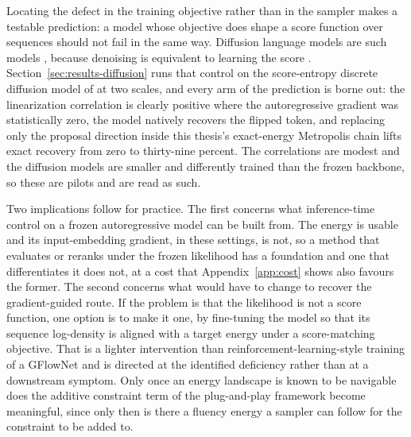 Locating the defect in the training objective rather than in the sampler makes a testable prediction: a model whose objective does shape a score function over sequences should not fail in the same way. Diffusion language models are such models \citep{li2022diffusion, lou2024discrete}, because denoising is equivalent to learning the score \citep{vincent2011connection, song2019generative, ho2020denoising}. Section~\ref{sec:results-diffusion} runs that control on the score-entropy discrete diffusion model of \citet{lou2024discrete} at two scales, and every arm of the prediction is borne out: the linearization correlation is clearly positive where the autoregressive gradient was statistically zero, the model natively recovers the flipped token, and replacing only the proposal direction inside this thesis's exact-energy Metropolis chain lifts exact recovery from zero to thirty-nine percent. The correlations are modest and the diffusion models are smaller and differently trained than the frozen backbone, so these are pilots and are read as such.

Two implications follow for practice. The first concerns what inference-time control on a frozen autoregressive model can be built from. The energy is usable and its input-embedding gradient, in these settings, is not, so a method that evaluates or reranks under the frozen likelihood has a foundation and one that differentiates it does not, at a cost that Appendix~\ref{app:cost} shows also favours the former. The second concerns what would have to change to recover the gradient-guided route. If the problem is that the likelihood is not a score function, one option is to make it one, by fine-tuning the model so that its sequence log-density is aligned with a target energy under a score-matching objective. That is a lighter intervention than reinforcement-learning-style training of a GFlowNet and is directed at the identified deficiency rather than at a downstream symptom. Only once an energy landscape is known to be navigable does the additive constraint term of the plug-and-play framework become meaningful, since only then is there a fluency energy a sampler can follow for the constraint to be added to.
